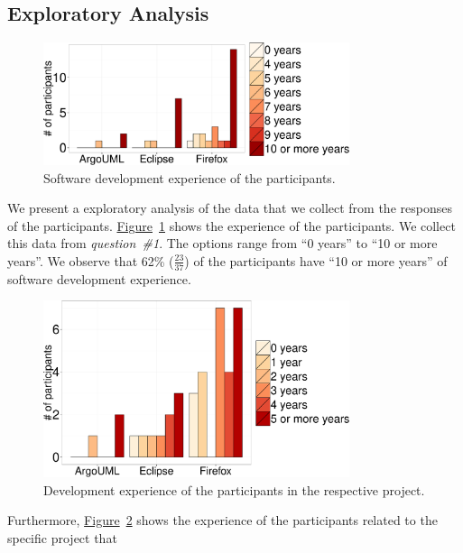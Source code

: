 \subsection{Exploratory Analysis}\label{subsubsec:exploratory}

\begin{figure}
	\centering
	\includegraphics[width=0.80\textwidth,keepaspectratio] 
	{chapters/chapter5/figures/demographic_experience.pdf}
	\caption{Software development experience of the participants.}
	\label{fig:demographics_experience}
\end{figure}
We present a exploratory analysis of the data that we collect from the responses
of the participants.
\hyperref[fig:demographics_experience]{Figure}~\ref{fig:demographics_experience}
shows the experience of the participants. We collect this data from {\em
question~\#1}. The options range from ``0 years'' to ``10 or more years''. We
observe that 62\% ($\frac{23}{37}$) of the participants have ``10 or more
years'' of software development experience. 
\begin{figure}
	\centering
	\includegraphics[width=0.80\textwidth,keepaspectratio] 
	{chapters/chapter5/figures/demographic_experience_project.pdf}
	\caption{Development experience of the participants in the
	respective project.}
	\label{fig:demographics_experience_project}
\end{figure}
Furthermore,
\hyperref[fig:demographics_experience_project]{Figure}~\ref{fig:demographics_experience_project}
shows the experience of the participants related to the specific project that
